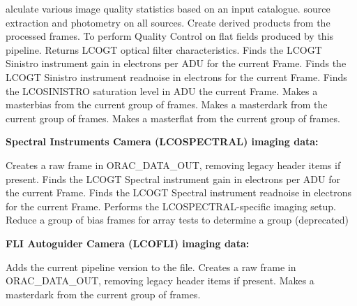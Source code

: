 \documentclass[twoside,11pt,nolof]{starlink}
\begin{document}
\begin{small}
\begin{description}
alculate various image quality statistics based on an input catalogue.
source extraction and photometry on all sources.
Create derived products from the processed frames.
To perform Quality Control on flat fields produced by this pipeline.
Returns LCOGT optical filter characteristics.
Finds the LCOGT Sinistro instrument gain in electrons per ADU for the current Frame.
Finds the LCOGT Sinistro instrument readnoise in electrons for the current Frame.
Finds the LCOSINISTRO saturation level in ADU the current Frame.
Makes a masterbias from the current group of frames.
Makes a masterdark from the current group of frames.
Makes a masterflat from the current group of frames.
\end{description}

{\large
\begin{center}
\textbf{Spectral Instruments Camera (LCOSPECTRAL) imaging data:}
\end{center}
}

\begin{description}
Creates a raw frame in ORAC\_DATA\_OUT, removing legacy header items if present.
Finds the LCOGT Spectral instrument gain in electrons per ADU for the current Frame.
Finds the LCOGT Spectral instrument readnoise in electrons for the current Frame.
Performs the LCOSPECTRAL-specific imaging setup.
Reduce a group of bias frames for array tests to determine a group (deprecated)
\end{description}

{\large
\begin{center}
\textbf{FLI Autoguider Camera (LCOFLI) imaging data:}
\end{center}
}

\begin{description}
Adds the current pipeline version to the file.
Creates a raw frame in ORAC\_DATA\_OUT, removing legacy header items if present.
Makes a masterdark from the current group of frames.
\end{description}


\end{small}
\end{document}
